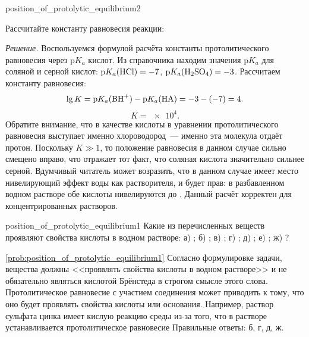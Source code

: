 \begin{example}{}{position_of_protolytic_equilibrium2}
    \begin{condition}
        Рассчитайте константу равновесия реакции:
    \end{condition}

    \medskip

    \textit{Решение.} Воспользуемся формулой расчёта константы протолитического равновесия через $\text{p}K_a$ кислот. Из справочника находим значения $\text{p}K_a$ для соляной и серной кислот: $\text{p}K_a(\ce{HCl}) = -7$, $\text{p}K_a(\ce{H2SO4}) = -3$. Рассчитаем константу равновесия:
    \begin{equation*}
        \lg K = \text{p}K_a(\ce{BH^+}) - \text{p}K_a(\ce{HA}) = -3 - (-7) = 4.
    \end{equation*}
    \begin{equation*}
        K = \num{e4}.
    \end{equation*}
    Обратите внимание, что в качестве кислоты  в уравнении протолитического равновесия выступает именно хлороводород~--- именно эта молекула отдаёт протон. Поскольку $K \gg 1$, то положение равновесия в данном случае сильно смещено вправо, что отражает тот факт, что соляная кислота значительно сильнее серной. Вдумчивый читатель может возразить, что в данном случае имеет место нивелирующий эффект воды как растворителя, и будет прав: в разбавленном водном растворе обе кислоты нивелируются до . Данный расчёт корректен для концентрированных растворов.
\end{example}

\begin{problem}{}{position_of_protolytic_equilibrium1}
    Какие из перечисленных веществ проявляют свойства кислоты в водном растворе: а) ; б) ; в) ; г) ; д) ; е) ; ж) ?
    \begin{sol}{\ref{prob:position_of_protolytic_equilibrium1}}
        Согласно формулировке задачи, вещества должны <<проявлять свойства кислоты в водном растворе>> и не обязательно являться кислотой Брёнстеда в строгом смысле этого слова. Протолитическое равновесие с участием соединения может приводить к тому, что оно будет проявлять свойства кислоты или основания. Например, раствор сульфата цинка имеет кислую реакцию среды из-за того, что в растворе устанавливается протолитическое равновесие
        Правильные ответы: б, г, д, ж.
    \end{sol}
\end{problem}


